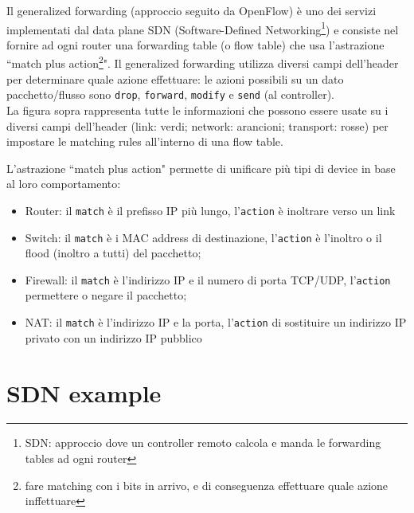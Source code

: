 Il generalized forwarding (approccio seguito da OpenFlow) è uno dei servizi implementati dal data plane SDN (Software-Defined Networking\footnote{SDN: approccio dove un controller remoto calcola e manda le forwarding tables ad ogni router}) e consiste nel fornire ad ogni router una forwarding table (o flow table) che usa l'astrazione ``match plus action\footnote{fare matching con i bits in arrivo, e di conseguenza effettuare quale azione inffettuare}". Il generalized forwarding utilizza diversi campi dell'header per determinare quale azione effettuare: le azioni possibili su un dato pacchetto/flusso sono \texttt{drop}, \texttt{forward}, \texttt{modify} e \texttt{send} (al controller).\\
La figura sopra rappresenta tutte le informazioni che possono essere usate su i diversi campi dell'header (link: verdi; network: arancioni; transport: rosse) per impostare le matching rules all'interno di una flow table.

L'astrazione ``match plus action" permette di unificare più tipi di device in base al loro comportamento:

\begin{itemize}
\item Router: il \texttt{match} è il prefisso IP più lungo, l'\texttt{action} è inoltrare verso un %
link
\item Switch: il \texttt{match} è i MAC address di destinazione, l'\texttt{action} è l'inoltro o il flood (inoltro a tutti) del pacchetto;
\item Firewall: il \texttt{match} è l'indirizzo IP e il numero di porta TCP/UDP, l'\texttt{action} permettere o negare il pacchetto;
\item NAT: il \texttt{match} è l'indirizzo IP e la porta, l'\texttt{action} di sostituire un indirizzo IP privato con un indirizzo IP pubblico
\end{itemize}

\section{SDN example}

